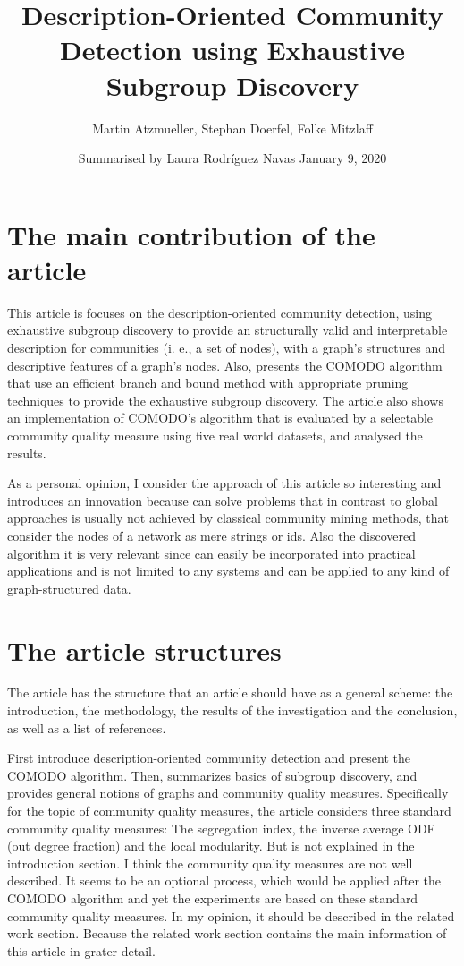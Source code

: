 \documentclass[a4paper]{article}
\title{Description-Oriented Community Detection using Exhaustive Subgroup Discovery}
\date{Summarised by Laura Rodríguez Navas \vskip 0.3cm January 9, 2020}
\author{Martin Atzmueller, Stephan Doerfel, Folke Mitzlaff}
\begin{document}
	
\maketitle

\section*{The main contribution of the article}
This article is focuses on the description-oriented community detection, using exhaustive subgroup discovery to provide an structurally valid and interpretable description for communities (i. e., a set of nodes), with a graph's structures and descriptive features of a graph’s nodes. Also, presents the COMODO algorithm that use an efficient branch and bound method with appropriate pruning techniques to provide the exhaustive subgroup discovery. The article also shows an implementation of COMODO's algorithm that is evaluated by a selectable community quality measure using five real world datasets, and analysed the results.
\vskip 0.3cm

As a personal opinion, I consider the approach of this article so interesting and introduces an innovation because can solve problems that in contrast to global approaches is usually not achieved by classical community mining methods, that consider the nodes of a network as mere strings or ids. Also the discovered algorithm it is very relevant since can easily be incorporated into practical applications and is not limited to any systems and can be applied to any kind of graph-structured data.

\section*{The article structures}
The article has the structure that an article should have as a general scheme: the introduction, the methodology, the results of the investigation and the conclusion, as well as a list of references.
\vskip 0.3cm

First introduce description-oriented community detection and present the COMODO algorithm. Then, summarizes basics of subgroup discovery, and provides general notions of graphs and community quality measures. Specifically for the topic of community quality measures, the article considers three standard community quality measures: The segregation index, the inverse average ODF (out degree fraction) and the local modularity. But is not explained in the introduction section. I think the community quality measures are not well described. It seems to be an optional process, which would be applied after the COMODO algorithm and yet the experiments are based on these standard community quality measures. In my opinion, it should be described in the related work section. Because the related work section contains the main information of this article in grater detail.
\vskip 0.3cm
\end{document}
